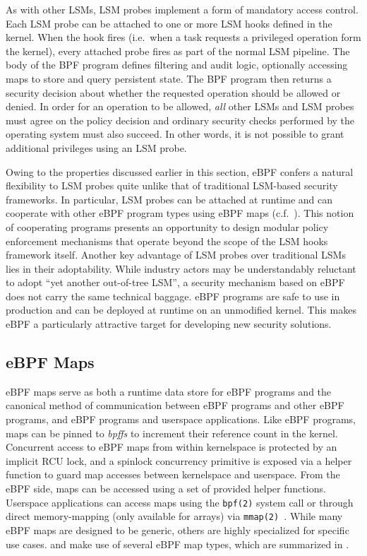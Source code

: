 As with other LSMs, LSM probes implement a form of mandatory access control. Each LSM
probe can be attached to one or more LSM hooks defined in the kernel. When the hook fires
(i.e.~when a task requests a privileged operation form the kernel), every attached probe
fires as part of the normal LSM pipeline. The body of the BPF program defines filtering
and audit logic, optionally accessing maps to store and query persistent state. The BPF
program then returns a security decision about whether the requested operation should be
allowed or denied.  In order for an operation to be allowed, \textit{all} other LSMs and
LSM probes must agree on the policy decision and ordinary security checks performed by the
operating system must also succeed. In other words, it is not possible to grant additional
privileges using an LSM probe.

Owing to the properties discussed earlier in this section, eBPF confers a natural
flexibility to LSM probes quite unlike that of traditional LSM-based security frameworks.
In particular, LSM probes can be attached at runtime and can cooperate with other eBPF
program types using eBPF maps (c.f.~). This notion of cooperating
programs presents an opportunity to design modular policy enforcement mechanisms that
operate beyond the scope of the LSM hooks framework itself.  Another key advantage of LSM
probes over traditional LSMs lies in their adoptability.  While industry actors may be
understandably reluctant to adopt \enquote{yet another out-of-tree LSM}, a security
mechanism based on eBPF does not carry the same technical baggage.  eBPF programs are safe
to use in production and can be deployed at runtime on an unmodified kernel.  This makes
eBPF a particularly attractive target for developing new security solutions.

\subsection{eBPF Maps}%
\label{ss:bpf-maps-bg}

eBPF maps serve as both a runtime data store for eBPF programs and the canonical method of
communication between eBPF programs and other eBPF programs, and eBPF programs and
userspace applications. Like eBPF programs, maps can be pinned to \textit{bpffs} to
increment their reference count in the kernel. Concurrent access to eBPF maps from within
kernelspace is protected by an implicit RCU lock, and a spinlock concurrency primitive is
exposed via a helper function to guard map accesses between kernelspace and userspace.
From the eBPF side, maps can be accessed using a set of provided helper functions.
Userspace applications can access maps using the \texttt{bpf(2)} system call or through
direct memory-mapping (only available for arrays) via
\texttt{mmap(2)~\cite{gregg2019_bpf}}. While many eBPF maps are designed to be generic,
others are highly specialized for specific use cases. \bpfcontain{} and \bpfbox{} make
use of several eBPF map types, which are summarized in .

